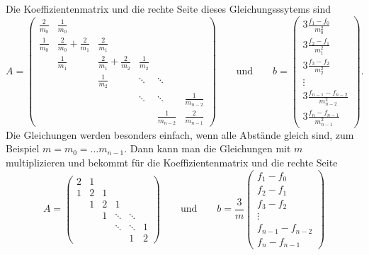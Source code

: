 Die Koeffizientenmatrix und die rechte Seite dieses Gleichungsssytems sind
\[
A
=
\begin{pmatrix}
\displaystyle\frac{2}{m_0}
	&\displaystyle\frac{1}{m_0}
		&
			&
				&
					&
\\[8pt]
\displaystyle\frac{1}{m_0}
	&\displaystyle\frac{2}{m_0}+\frac{2}{m_1}
		&\displaystyle\frac{2}{m_1}
			&
				&
					&
\\[8pt]
	&\displaystyle\frac{1}{m_1}
		&\displaystyle\frac{2}{m_1}+\frac{2}{m_2}
			&\displaystyle\frac{1}{m_2}
				&
					&
\\[8pt]
	&
		&\displaystyle\frac{1}{m_2}
			&\ddots
				&\ddots
					&
\\[8pt]
	&
		&
			&\ddots
				&\ddots
					&\displaystyle\frac{1}{m_{n-2}}
\\[8pt]
	&
		&
			&
				&\displaystyle\frac{1}{m_{n-2}}
					&\displaystyle\frac{2}{m_{n-1}}
\end{pmatrix}
\qquad\text{und}\qquad
b
=
\begin{pmatrix}
\displaystyle3\frac{f_1-f_0}{m_0^2} \\[8pt]
\displaystyle3\frac{f_2-f_1}{m_1^2} \\[8pt]
\displaystyle3\frac{f_3-f_2}{m_2^2} \\[8pt]
\vdots \\[8pt]
\displaystyle3\frac{f_{n-1}-f_{n-2}}{m_{n-2}^2} \\[8pt]
\displaystyle3\frac{f_n-f_{n-1}}{m_{n-1}^2} 
\end{pmatrix}.
\]
Die Gleichungen werden besonders einfach, wenn alle Abstände gleich sind,
zum Beispiel $m=m_0=\dots m_{n-1}$.
Dann kann man die Gleichungen mit $m$ multiplizieren und bekommt für die
Koeffizientenmatrix und die rechte Seite
\[
A
=
\begin{pmatrix}
2&1& &      &      & \\
1&2&1&      &      & \\
 &1&2&1     &      & \\
 & &1&\ddots&\ddots& \\
 & & &\ddots&\ddots&1\\
 & & &      &     1&2
\end{pmatrix}
\qquad\text{und}\qquad
b
=
\frac{3}{m}
\begin{pmatrix}
f_1-f_0\\
f_2-f_1\\
f_3-f_2\\
\vdots\\
f_{n-1}-f_{n-2}\\
f_n-f_{n-1}

\end{pmatrix}
\]


